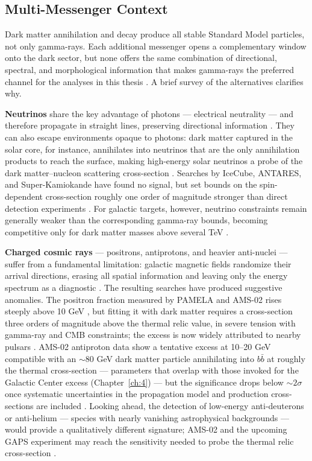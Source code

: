 \subsection{Multi-Messenger Context}
\label{sec:multi_messenger}

Dark matter annihilation and decay produce all stable Standard Model particles, not only gamma-rays.
Each additional messenger opens a complementary window onto the dark sector, but none offers the same combination of directional, spectral, and morphological information that makes gamma-rays the preferred channel for the analyses in this thesis \cite{Cirelli:2024ssz}.
A brief survey of the alternatives clarifies why.

\textbf{Neutrinos} share the key advantage of photons --- electrical neutrality --- and therefore propagate in straight lines, preserving directional information \cite{Cirelli:2024ssz,Hooper:2024}.
They can also escape environments opaque to photons: dark matter captured in the solar core, for instance, annihilates into neutrinos that are the only annihilation products to reach the surface, making high-energy solar neutrinos a probe of the dark matter--nucleon scattering cross-section \cite{Cirelli:2024ssz}.
Searches by IceCube, ANTARES, and Super-Kamiokande have found no signal, but set bounds on the spin-dependent cross-section roughly one order of magnitude stronger than direct detection experiments \cite{IceCube:2016dgk,Cirelli:2024ssz}.
For galactic targets, however, neutrino constraints remain generally weaker than the corresponding gamma-ray bounds, becoming competitive only for dark matter masses above several TeV \cite{Cirelli:2024ssz}.

\textbf{Charged cosmic rays} --- positrons, antiprotons, and heavier anti-nuclei --- suffer from a fundamental limitation: galactic magnetic fields randomize their arrival directions, erasing all spatial information and leaving only the energy spectrum as a diagnostic \cite{Cirelli:2024ssz,Pinetti:2021jjs}.
The resulting searches have produced suggestive anomalies.
The positron fraction measured by PAMELA and AMS-02 rises steeply above 10 GeV \cite{PAMELA:2008gwm,Cirelli:2024ssz}, but fitting it with dark matter requires a cross-section three orders of magnitude above the thermal relic value, in severe tension with gamma-ray and CMB constraints; the excess is now widely attributed to nearby pulsars \cite{Cirelli:2024ssz,Hooper:2024}.
AMS-02 antiproton data show a tentative excess at 10--20 GeV compatible with an $\sim$80 GeV dark matter particle annihilating into $b\bar{b}$ at roughly the thermal cross-section \cite{Cuoco:2016eej,Cirelli:2024ssz} --- parameters that overlap with those invoked for the Galactic Center excess (Chapter~\ref{ch:4}) --- but the significance drops below $\sim 2\sigma$ once systematic uncertainties in the propagation model and production cross-sections are included \cite{Cirelli:2024ssz}.
Looking ahead, the detection of low-energy anti-deuterons or anti-helium --- species with nearly vanishing astrophysical backgrounds --- would provide a qualitatively different signature; AMS-02 and the upcoming GAPS experiment may reach the sensitivity needed to probe the thermal relic cross-section \cite{Cirelli:2024ssz,Hooper:2024}.

